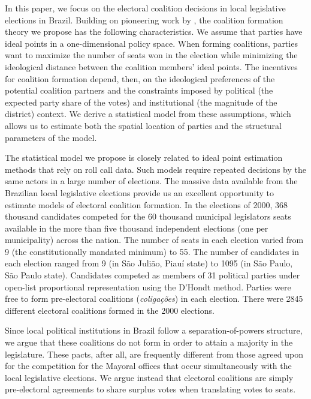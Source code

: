 In this paper, we focus on the electoral coalition decisions in local legislative elections in Brazil. Building on pioneering work by \cite{soares:1964}, the coalition formation theory we propose has the following characteristics. We assume that parties  have ideal points in a one-dimensional policy space. When forming coalitions, parties want to maximize the number of seats won in the election while minimizing the ideological distance between the coalition members' ideal points. The incentives for coalition formation depend, then, on the ideological preferences of the potential coalition partners and the constraints imposed by political  (the expected party share of the votes) and institutional (the magnitude of the district) context. We derive a statistical model from these assumptions, which allows us to estimate both the spatial location of parties and the structural parameters of the model.

The statistical model we propose is closely related to ideal point estimation methods that rely on roll call data. Such models require  repeated decisions by the same actors in a large number of elections. The massive data available from the Brazilian local legislative elections provide us an excellent opportunity to estimate models of electoral coalition formation. In the elections of 2000, 368 thousand  candidates competed  for the  60 thousand  municipal legislators seats available in the more than five thousand independent elections (one per municipality) across the nation. The number of seats in each election varied from 9 (the constitutionally mandated minimum) to 55.  The number of candidates in each election ranged from 9 (in São Julião, Piauí state) to 1095 (in São Paulo, São Paulo state).  Candidates competed as members of 31 political parties under open-list proportional representation using the D'Hondt method. Parties were free to form  pre-electoral coalitions (\emph{coligações}) in each election. There were 2845 different electoral coalitions formed in the 2000 elections.

Since local political institutions in Brazil follow a separation-of-powers structure, we argue that these coalitions do not form in order to attain a majority in the legislature. These pacts, after all,  are frequently different from those agreed upon for the competition for the Mayoral offices that occur simultaneously with the local legislative elections.  We argue instead that electoral coalitions are simply pre-electoral agreements to share surplus votes when translating votes to seats. 

